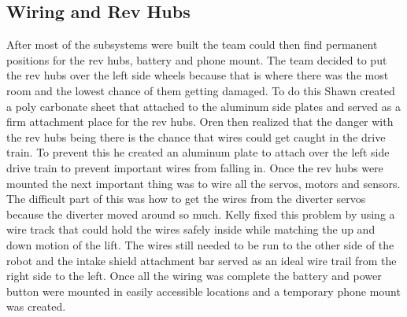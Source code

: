 \documentclass{article}
\begin{document}
\subsection{Wiring and Rev Hubs}
After most of the subsystems were built the team could then find permanent positions for the rev hubs, battery and phone mount. The team decided to put the rev hubs over the left side wheels because that is where there was the most room and the lowest chance of them getting damaged. To do this Shawn created a poly carbonate sheet that attached to the aluminum side plates and served as a firm attachment place for the rev hubs. Oren then realized that the danger with the rev hubs being there is the chance that wires could get caught in the drive train. To prevent this he created an aluminum plate to attach over the left side drive train to prevent important wires from falling in. Once the rev hubs were mounted the next important thing was to wire all the servos, motors and sensors. The difficult part of this was how to get the wires from the diverter servos because the diverter moved around so much. Kelly fixed this problem by using a wire track that could hold the wires safely inside while matching the up and down motion of the lift. The wires still needed to be run to the other side of the robot and the intake shield attachment bar served as an ideal wire trail from the right side to the left. Once all the wiring was complete the battery and power button were mounted in easily accessible locations and a temporary phone mount was created.
\end{document}
